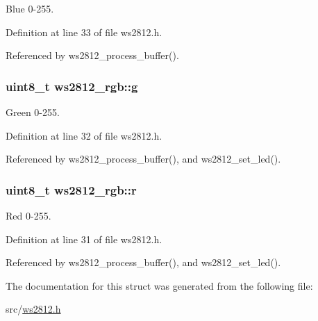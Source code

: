 Blue 0-\/255. 



Definition at line 33 of file ws2812.\+h.



Referenced by ws2812\+\_\+process\+\_\+buffer().

\hypertarget{structws2812__rgb_aaf5b0f4db796641e1cd16bd4f70fc7ac}{}
\subsubsection[{g}]{\setlength{\rightskip}{0pt plus 5cm}uint8\+\_\+t ws2812\+\_\+rgb\+::g}\label{structws2812__rgb_aaf5b0f4db796641e1cd16bd4f70fc7ac}


Green 0-\/255. 



Definition at line 32 of file ws2812.\+h.



Referenced by ws2812\+\_\+process\+\_\+buffer(), and ws2812\+\_\+set\+\_\+led().

\hypertarget{structws2812__rgb_accf7188c624788256477c2e4ee54515b}{}
\subsubsection[{r}]{\setlength{\rightskip}{0pt plus 5cm}uint8\+\_\+t ws2812\+\_\+rgb\+::r}\label{structws2812__rgb_accf7188c624788256477c2e4ee54515b}


Red 0-\/255. 



Definition at line 31 of file ws2812.\+h.



Referenced by ws2812\+\_\+process\+\_\+buffer(), and ws2812\+\_\+set\+\_\+led().



The documentation for this struct was generated from the following file\+:\begin{DoxyCompactItemize}
\item 
src/\hyperlink{ws2812_8h}{ws2812.\+h}\end{DoxyCompactItemize}
